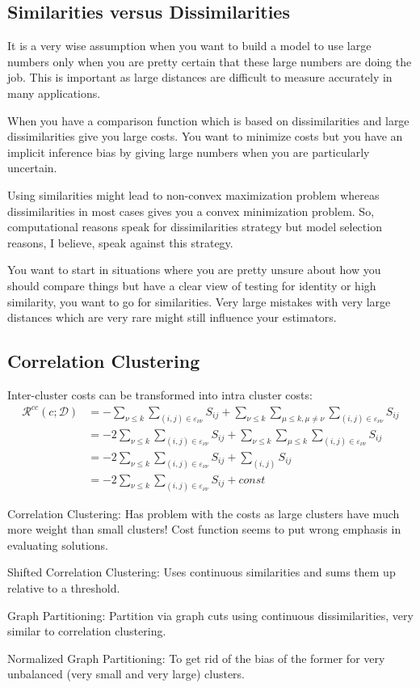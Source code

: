 \documentclass[12pt]{article}
\begin{document}
\subsection{Similarities versus Dissimilarities}
\par It is a very wise assumption when you want to build a model to use large numbers only when you are pretty certain that these large numbers are doing the job. This is important as large distances are difficult to measure accurately in many applications.
\par When you have a comparison function which is based on dissimilarities and large dissimilarities give you large costs. You want to minimize costs but you have an implicit inference bias by giving large numbers when you are particularly uncertain.
\par Using similarities might lead to non-convex maximization problem whereas dissimilarities in most cases gives you a convex minimization problem. So, computational reasons speak for dissimilarities strategy but model selection reasons, I believe, speak against this strategy.
\par You want to start in situations where you are pretty unsure about how you should compare things but have a clear view of testing for identity or high similarity, you want to go for similarities. Very large mistakes with very large distances which are very rare might still influence your estimators.

\subsection{Correlation Clustering}
Inter-cluster costs can be transformed into intra cluster costs:
\begin{equation*}
\begin{split}
\mathcal{R}^{cc}(c ; \mathcal{D}) &= - \sum_{\nu \leq k} \sum_{(i,j)\in \varepsilon_{\nu\nu}} S_{ij} + \sum_{\nu \leq k} \sum_{\mu\leq k, \mu\neq\nu} \sum_{(i,j)\in \varepsilon_{\nu\nu}} S_{ij} \\
&= - 2\sum_{\nu \leq k} \sum_{(i,j)\in \varepsilon_{\nu\nu}} S_{ij} + \sum_{\nu \leq k} \sum_{\mu\leq k} \sum_{(i,j)\in \varepsilon_{\nu\nu}} S_{ij} \\
&= - 2\sum_{\nu \leq k} \sum_{(i,j)\in \varepsilon_{\nu\nu}} S_{ij} + \sum_{(i,j)} S_{ij} \\
&= - 2\sum_{\nu \leq k} \sum_{(i,j)\in \varepsilon_{\nu\nu}} S_{ij} + const 
\end{split}
\end{equation*}
\ulb
\item Correlation Clustering: Has problem with the costs as large clusters have much more weight than small clusters! Cost function seems to put wrong emphasis in evaluating solutions.
\item Shifted Correlation Clustering: Uses continuous similarities and sums them up relative to a threshold.
\item Graph Partitioning: Partition via graph cuts using continuous dissimilarities, very similar to correlation clustering.
\item Normalized Graph Partitioning: To get rid of the bias of the former for very unbalanced (very small and very large) clusters.
\ule
\end{document}
